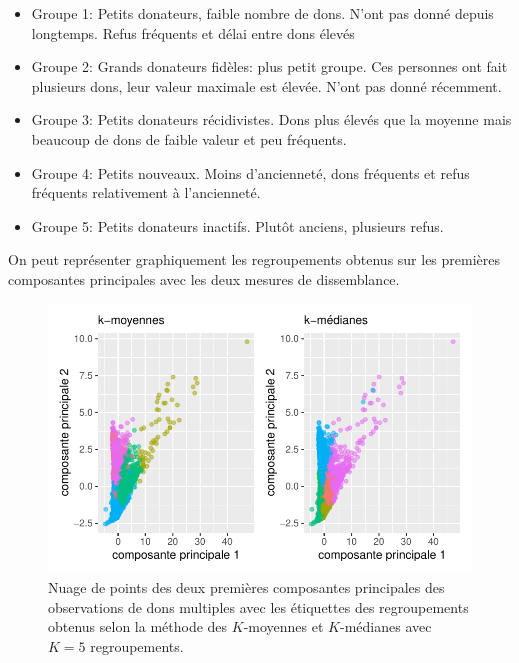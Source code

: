 \documentclass[
  11pt,
  letterpaper,
]{scrbook}
\providecommand{\tightlist}{%
  \setlength{\itemsep}{0pt}\setlength{\parskip}{0pt}}\usepackage{longtable,booktabs,array}
\theoremstyle{definition}
\theoremstyle{remark}
\begin{document}
\begin{itemize}
\tightlist
\item
  Groupe 1: Petits donateurs, faible nombre de dons. N'ont pas donné
  depuis longtemps. Refus fréquents et délai entre dons élevés
\item
  Groupe 2: Grands donateurs fidèles: plus petit groupe. Ces personnes
  ont fait plusieurs dons, leur valeur maximale est élevée. N'ont pas
  donné récemment.
\item
  Groupe 3: Petits donateurs récidivistes. Dons plus élevés que la
  moyenne mais beaucoup de dons de faible valeur et peu fréquents.
\item
  Groupe 4: Petits nouveaux. Moins d'ancienneté, dons fréquents et refus
  fréquents relativement à l'ancienneté.
\item
  Groupe 5: Petits donateurs inactifs. Plutôt anciens, plusieurs refus.
\end{itemize}

On peut représenter graphiquement les regroupements obtenus sur les
premières composantes principales avec les deux mesures de dissemblance.

\begin{figure}[ht!]

{\centering \includegraphics{./03-regroupements_files/figure-pdf/fig-acpkmoy5-1.pdf}

}

\caption{\label{fig-acpkmoy5}Nuage de points des deux premières
composantes principales des observations de dons multiples avec les
étiquettes des regroupements obtenus selon la méthode des \(K\)-moyennes
et \(K\)-médianes avec \(K=5\) regroupements.}

\end{figure}
\end{document}
